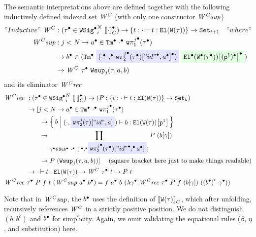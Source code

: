 The semantic interpretations above are defined together with the following inductively defined indexed set $\mathit{W}^C$ (with only one constructor $\mathit{W^Csup}$)
%
\begin{align*}
  "Inductive"~\CWmodel &: (\Glued{\wsig} \in \GWSig{i}{\denotesCC{\cdot}}{N}) \to \{ t : \goodTerm{\cdot}{t}{\El{\wcode{\wsig}}} \} \to \Set{i + 1} \quad "where" \\
    \CWsup &: j < N \to \Glued{a} \in \GTm{\Glued{\cdot}}{\Gwsigproj{j}{1}{\Glued{\wsig}}} \\
    & \to \Glued{b} \in (\GTm{
      \colorbox{blue!10}{(\Glued{\cdot} \Glued{,} \Gsub{\Gwsigproj{j}{2}{\Glued{\wsig}}}{\SubstExt{\GSubstId}{\Glued{a}}})} 
      }{
        \colorbox{green!10}{\Gsub{\GEl{\Gwcode{\Glued{\wsig}}}}{\GSubstWeak{1}}}
        }) \\
    & \to \CWmodel~\Glued{\wsig}~\Wsup{j}{\wsig}{a}{b}
\end{align*}
and its eliminator $\mathit{W^Crec}$
\begin{align*}
  \CWrec \  &: (\Glued{\wsig} \in \GWSig{i}{\denotesCC{\cdot}}{N}) \to 
    (P : \{ t : \goodTerm{\cdot}{t}{\El{\wcode{\wsig}}} \} \to \Set{k})  \\
    & \to 
    [j < N \to  \Glued{a} \in \GTm{\Glued{\cdot}}{\Gwsigproj{j}{1}{\Glued{\wsig}}} \\ 
    & \quad \quad \to 
    \setc{b}{\goodTerm{({\cdot} , 
    \colorbox{blue!10}{\sub{\wsigproj{j}{2}{{\wsig}}}{\SubstExt{"id"}{{a}}}}
    ) }{b}{\sub{\El{\wcode{\wsig}}}{\SubstWeak{1}}}} \\ 
    & \quad \quad \to  \prod_{\Glued{\gm} \in \GSub{\Glued{\cdot}}{(\Glued{\cdot} \Glued{,} 
    \colorbox{blue!10}{\sub{\Gwsigproj{j}{2}{\Glued{\wsig}}}{\GSubstExt{\GSubstId}{\Glued{a}}}} )}} P~(\sub{b}{ \gm }) \\
    & \quad \quad \to P~(\Wsup{j}{\wsig}{a}{b}) ] \quad \text{ (square bracket here just to make things readable)} \\
    & \to \goodTerm{\cdot}{t}{\El{\wcode{\wsig}}} \to \CWmodel~\Glued{\wsig}~t \to P~t \\
  \CWrec \  & \Glued{\wsig}~P~f~t~(\CWsup~\Glued{a}~\Glued{b}) = f~\Glued{a}~b~(\lambda \Glued{\gm}. \CWrec~\Glued{\wsig}~P~f~(\sub{b}{\gm})~(\Gmodel{\Glued{b}}~\Glued{\gm}))
\end{align*}

Note that in $\mathit{W^Csup}$, the ${b}^\bullet$ uses the definition of
${\llbracket {\ensuremath{\texttt{W}({\tau})}} \rrbracket}_C$, which after unfolding, recursively references $\mathit{W}^C$
in a strictly positive position. %
We do not distinguish $(b, b^c)$ and ${b}^\bullet$ for simplicity. Again, we omit validating the equational rules ($\beta$, $\eta$, and substitution) here.

